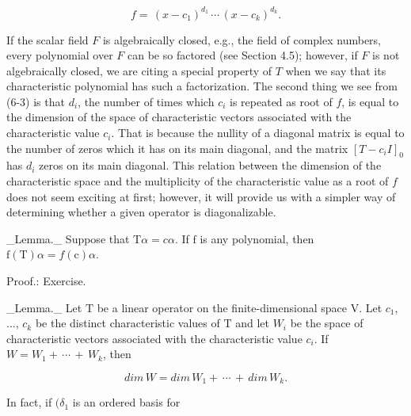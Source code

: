 \[f=\,(x-c_{1})^{d_{1}}\,\cdots\,(x-c_{k})^{d_{k}}.\]

If the scalar field \(F\) is algebraically closed, e.g., the field of complex numbers, every polynomial over \(F\) can be so factored (see Section 4.5); however, if \(F\) is not algebraically closed, we are citing a special property of \(T\) when we say that its characteristic polynomial has such a factorization. The second thing we see from (6-3) is that \(d_{i}\), the number of times which \(c_{i}\) is repeated as root of \(f\), is equal to the dimension of the space of characteristic vectors associated with the characteristic value \(c_{i}\). That is because the nullity of a diagonal matrix is equal to the number of zeros which it has on its main diagonal, and the matrix \([T-c_{i}I]_{0}\) has \(d_{i}\) zeros on its main diagonal. This relation between the dimension of the characteristic space and the multiplicity of the characteristic value as a root of \(f\) does not seem exciting at first; however, it will provide us with a simpler way of determining whether a given operator is diagonalizable.

_Lemma._ Suppose that \(\mathrm{T}\alpha=c\alpha\). If \(\mathrm{f}\) is any polynomial, then \(\mathrm{f}(\mathrm{T})\alpha=f(\mathrm{c})\alpha\).

Proof.: Exercise.

_Lemma._ Let \(\mathrm{T}\) be a linear operator on the finite-dimensional space \(\mathrm{V}\). Let \(c_{1}\), \(\ldots\), \(c_{k}\) be the distinct characteristic values of \(\mathrm{T}\) and let \(W_{i}\) be the space of characteristic vectors associated with the characteristic value \(c_{i}\). If \(W=W_{1}+\,\cdots\,+\,W_{k}\), then

\[dim\,W=dim\,W_{1}+\,\cdots\,+\,dim\,W_{k}.\]

In fact, if \((\delta_{1}\) is an ordered basis for \ 